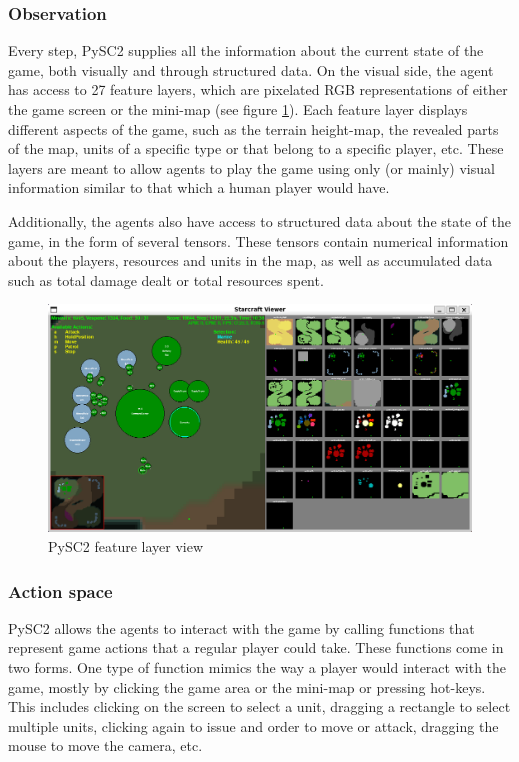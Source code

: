 \subsubsection*{Observation}

Every step, PySC2 supplies all the information about the current state of the game, both visually and through structured data. On the visual side, the agent has access to 27 feature layers, which are pixelated RGB representations of either the game screen or the mini-map (see figure \ref{fig:feature_layers}). Each feature layer displays different aspects of the game, such as the terrain height-map, the revealed parts of the map, units of a specific type or that belong to a specific player, etc. These layers are meant to allow agents to play the game using only (or mainly) visual information similar to that which a human player would have.

Additionally, the agents also have access to structured data about the state of the game, in the form of several tensors. These tensors contain numerical information about the players, resources and units in the map, as well as accumulated data such as total damage dealt or total resources spent.

\begin{figure}[h]
    \centering
    \includegraphics[width=1\textwidth]{figs/feature_layers.png}
    \caption{PySC2 feature layer view}
    \label{fig:feature_layers}
\end{figure}

\subsubsection*{Action space}

PySC2 allows the agents to interact with the game by calling functions that represent game actions that a regular player could take. These functions come in two forms. One type of function mimics the way a player would interact with the game, mostly by clicking the game area or the mini-map or pressing hot-keys. This includes clicking on the screen to select a unit, dragging a rectangle to select multiple units, clicking again to issue and order to move or attack, dragging the mouse to move the camera, etc.

